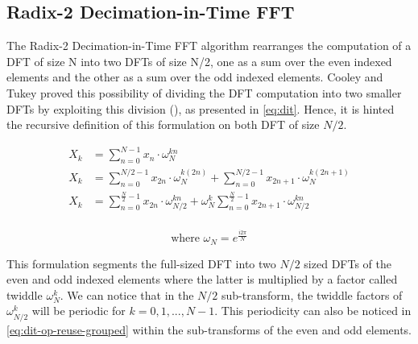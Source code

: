 \documentclass[
  oneside,
  11pt, a4paper,
  footinclude=true,
  headinclude=true,
  cleardoublepage=empty
]{scrbook}
\begin{document}

\subsection{Radix-2 Decimation-in-Time FFT} \label{subsec:radix-2-decimation-in-time-fft}


The Radix-2 Decimation-in-Time FFT algorithm rearranges the computation of a DFT of size N into two DFTs of size N/2, one as a sum over the even indexed elements and the other as a sum over the odd indexed elements. Cooley and Tukey proved this possibility of dividing the DFT computation into two smaller DFTs by exploiting this division (\cite{cooley1965algorithm}), as presented in \autoref{eq:dit}. Hence, it is hinted the recursive definition of this formulation on both DFT of size $N/2$.

\begin{equation} \label{eq:dit}
    \begin{split}
        X_{k} &= \sum_{n=0}^{N-1}x_{n} \cdot \omega_{N}^{kn} \\
        X_{k} &= \sum_{n=0}^{N/2-1}x_{2n} \cdot \omega_{N}^{k(2n)} + \sum_{n=0}^{N/2-1}x_{2n+1} \cdot \omega_{N}^{k(2n+1)} \\
        X_{k} &= \sum_{n=0}^{\frac{N}{2}-1}x_{2n} \cdot \omega_{N/2}^{kn} + \omega_{N}^{k} \sum_{n=0}^{\frac{N}{2}-1}x_{2n+1} \cdot \omega_{N/2}^{kn} \\
    \end{split}
\end{equation}


\begin{equation*}
    \text{where } \omega_{N} = e^{\frac{i 2 \pi}{N}}
\end{equation*}



This formulation segments the full-sized DFT into two $N/2$ sized DFTs of the even and odd indexed elements where the latter is multiplied by a factor called twiddle $\omega_{N}^{k}$. We can notice that in the $N/2$ sub-transform, the twiddle factors of $\omega^{k}_{N/2}$ will be periodic for $k=0,1,...,N-1$. This periodicity can also be noticed in \autoref{eq:dit-op-reuse-grouped} within the sub-transforms of the even and odd elements.
\end{document}
